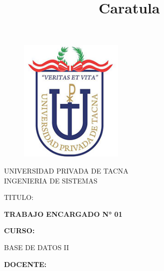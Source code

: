 \documentclass[12pt,letterpaper]{article}
\begin{document}
\title{Caratula}
\begin{titlepage}
\begin{figure}[htb]
\begin{center}
\includegraphics[width=5cm]{./Imagenes/logo.png}
\end{center}
\end{figure}
\vspace*{-0.25in}
\begin{center}
\large{UNIVERSIDAD PRIVADA DE TACNA}\\
\vspace*{-0.025in}
INGENIERIA DE SISTEMAS  \\

\vspace*{0.5in}
\begin{large}
TITULO:\\
\end{large}

\vspace*{0.1in}
\begin{Large}
\textbf{TRABAJO ENCARGADO N° 01} \\
\end{Large}

\vspace*{0.3in}
\begin{Large}
\textbf{CURSO:} \\
\end{Large}

\vspace*{0.1in}
\begin{large}
BASE DE DATOS II\\
\end{large}

\vspace*{0.3in}
\begin{Large}
\textbf{DOCENTE:} \\
\end{Large}


\end{center}
\end{titlepage}
\end{document}
